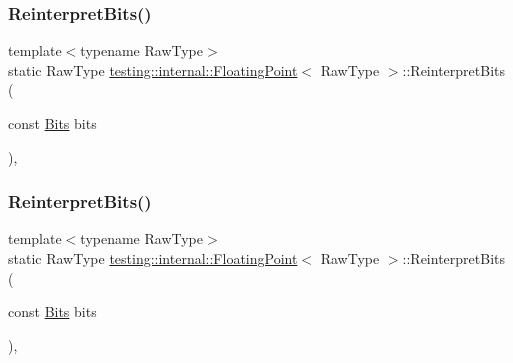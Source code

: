 \mbox{\label{classtesting_1_1internal_1_1_floating_point_ac551f793522e54fbd8a25acb79eac5b1}} 
\subsubsection{\texorpdfstring{ReinterpretBits()}{ReinterpretBits()}\hspace{0.1cm}{\footnotesize\ttfamily [1/3]}}
{\footnotesize\ttfamily template$<$typename Raw\+Type$>$ \\
static Raw\+Type \mbox{\hyperlink{classtesting_1_1internal_1_1_floating_point}{testing\+::internal\+::\+Floating\+Point}}$<$ Raw\+Type $>$\+::Reinterpret\+Bits (\begin{DoxyParamCaption}\item[{const \mbox{\hyperlink{classtesting_1_1internal_1_1_floating_point_abf228bf6cd48f12c8b44c85b4971a731}{Bits}}}]{bits }\end{DoxyParamCaption})\hspace{0.3cm}{\ttfamily [inline]}, {\ttfamily [static]}}

\mbox{\label{classtesting_1_1internal_1_1_floating_point_ac551f793522e54fbd8a25acb79eac5b1}} 
\subsubsection{\texorpdfstring{ReinterpretBits()}{ReinterpretBits()}\hspace{0.1cm}{\footnotesize\ttfamily [2/3]}}
{\footnotesize\ttfamily template$<$typename Raw\+Type$>$ \\
static Raw\+Type \mbox{\hyperlink{classtesting_1_1internal_1_1_floating_point}{testing\+::internal\+::\+Floating\+Point}}$<$ Raw\+Type $>$\+::Reinterpret\+Bits (\begin{DoxyParamCaption}\item[{const \mbox{\hyperlink{classtesting_1_1internal_1_1_floating_point_abf228bf6cd48f12c8b44c85b4971a731}{Bits}}}]{bits }\end{DoxyParamCaption})\hspace{0.3cm}{\ttfamily [inline]}, {\ttfamily [static]}}

